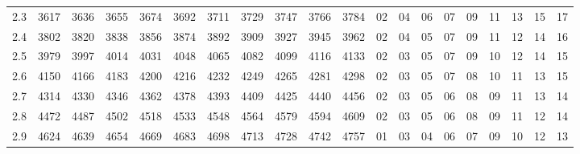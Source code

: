 \documentclass[12pt,UTF8,fontset=none]{ctexbook}
\begin{document}
\begin{appendix}
\begin{longtable}{|c| c c c c c | c c c c c| c c c c c c c c c|}
\scriptsize 2.3 & \scriptsize 3617 & \scriptsize 3636 & \scriptsize 3655 & \scriptsize 3674 & \scriptsize 3692 & \scriptsize 3711 & \scriptsize 3729 & \scriptsize 3747 & \scriptsize 3766 & \scriptsize 3784 & \scriptsize 02 & \scriptsize 04 & \scriptsize 06 & \scriptsize 07 & \scriptsize 09 & \scriptsize 11 & \scriptsize 13 & \scriptsize 15 & \scriptsize 17 \\
\scriptsize 2.4 & \scriptsize 3802 & \scriptsize 3820 & \scriptsize 3838 & \scriptsize 3856 & \scriptsize 3874 & \scriptsize 3892 & \scriptsize 3909 & \scriptsize 3927 & \scriptsize 3945 & \scriptsize 3962 & \scriptsize 02 & \scriptsize 04 & \scriptsize 05 & \scriptsize 07 & \scriptsize 09 & \scriptsize 11 & \scriptsize 12 & \scriptsize 14 & \scriptsize 16 \\
\scriptsize 2.5 & \scriptsize 3979 & \scriptsize 3997 & \scriptsize 4014 & \scriptsize 4031 & \scriptsize 4048 & \scriptsize 4065 & \scriptsize 4082 & \scriptsize 4099 & \scriptsize 4116 & \scriptsize 4133 & \scriptsize 02 & \scriptsize 03 & \scriptsize 05 & \scriptsize 07 & \scriptsize 09 & \scriptsize 10 & \scriptsize 12 & \scriptsize 14 & \scriptsize 15 \\
\scriptsize 2.6 & \scriptsize 4150 & \scriptsize 4166 & \scriptsize 4183 & \scriptsize 4200 & \scriptsize 4216 & \scriptsize 4232 & \scriptsize 4249 & \scriptsize 4265 & \scriptsize 4281 & \scriptsize 4298 & \scriptsize 02 & \scriptsize 03 & \scriptsize 05 & \scriptsize 07 & \scriptsize 08 & \scriptsize 10 & \scriptsize 11 & \scriptsize 13 & \scriptsize 15 \\
\scriptsize 2.7 & \scriptsize 4314 & \scriptsize 4330 & \scriptsize 4346 & \scriptsize 4362 & \scriptsize 4378 & \scriptsize 4393 & \scriptsize 4409 & \scriptsize 4425 & \scriptsize 4440 & \scriptsize 4456 & \scriptsize 02 & \scriptsize 03 & \scriptsize 05 & \scriptsize 06 & \scriptsize 08 & \scriptsize 09 & \scriptsize 11 & \scriptsize 13 & \scriptsize 14 \\
\scriptsize 2.8 & \scriptsize 4472 & \scriptsize 4487 & \scriptsize 4502 & \scriptsize 4518 & \scriptsize 4533 & \scriptsize 4548 & \scriptsize 4564 & \scriptsize 4579 & \scriptsize 4594 & \scriptsize 4609 & \scriptsize 02 & \scriptsize 03 & \scriptsize 05 & \scriptsize 06 & \scriptsize 08 & \scriptsize 09 & \scriptsize 11 & \scriptsize 12 & \scriptsize 14 \\
\scriptsize 2.9 & \scriptsize 4624 & \scriptsize 4639 & \scriptsize 4654 & \scriptsize 4669 & \scriptsize 4683 & \scriptsize 4698 & \scriptsize 4713 & \scriptsize 4728 & \scriptsize 4742 & \scriptsize 4757 & \scriptsize 01 & \scriptsize 03 & \scriptsize 04 & \scriptsize 06 & \scriptsize 07 & \scriptsize 09 & \scriptsize 10 & \scriptsize 12 & \scriptsize 13 \\

\end{longtable}
\end{appendix}
\end{document}
